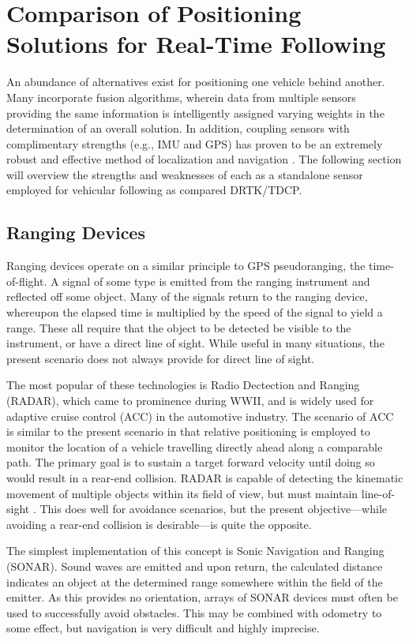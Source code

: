\documentclass[12pt]{report}
\begin{document}
\section{Comparison of Positioning Solutions for Real-Time Following}
An abundance of alternatives exist for positioning one vehicle behind another. Many incorporate fusion algorithms, wherein data from multiple sensors providing the same information is intelligently assigned varying weights in the determination of an overall solution. In addition, coupling sensors with complimentary strengths (e.g., IMU and GPS) has proven to be an extremely robust and effective method of localization and navigation \cite{scottthesis}. The following section will overview the strengths and weaknesses of each as a standalone sensor employed for vehicular following as compared DRTK/TDCP.

\subsection{Ranging Devices}
Ranging devices operate on a similar principle to GPS pseudoranging, the time-of-flight. A signal of some type is emitted from the ranging instrument and reflected off some object. Many of the signals return to the ranging device, whereupon the elapsed time is multiplied by the speed of the signal to yield a range. These all require that the object to be detected be visible to the instrument, or have a direct line of sight. While useful in many situations, the present scenario does not always provide for direct line of sight.

The most popular of these technologies is Radio Dectection and Ranging (RADAR), which came to prominence during WWII, and is widely used for adaptive cruise control (ACC) in the automotive industry. The scenario of ACC is similar to the present scenario in that relative positioning is employed to monitor the location of a vehicle travelling directly ahead along a comparable path. The primary goal is to sustain a target forward velocity until doing so would result in a rear-end collision.  RADAR is capable of detecting the kinematic movement of multiple objects within its field of view, but must maintain line-of-sight \cite{lidarvsradaracc}. This does well for avoidance scenarios, but the present objective---while avoiding a rear-end collision is desirable---is quite the opposite.

The simplest implementation of this concept is Sonic Navigation and Ranging (SONAR). Sound waves are emitted and upon return, the calculated distance indicates an object at the determined range somewhere within the field of the emitter. As this provides no orientation, arrays of SONAR devices must often be used to successfully avoid obstacles. This may be combined with odometry to some effect, but navigation is very difficult and highly imprecise.
\end{document}
